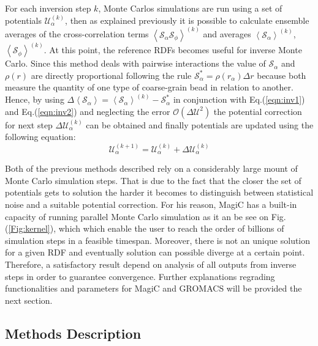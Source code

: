 \documentclass[10pt,a4paper,twoside]{article}
\begin{document}
For each inversion step $k$, Monte Carlos simulations are run using a set of potentials $\mathcal{U}_{\alpha}^{(k)}$, then as explained previously it is possible to calculate ensemble averages of the cross-correlation terms ${\left\langle\mathcal{S}_\alpha\mathcal{S}_\phi\right\rangle}^{(k)}$ and averages $\left\langle\mathcal{S}_\alpha\right\rangle^{(k)}$, $\left\langle\mathcal{S}_\phi\right\rangle^{(k)}$. At this point, the reference RDFs becomes useful for inverse Monte Carlo. Since this method deals with pairwise interactions the value of $\mathcal{S}_\alpha$ and $\rho(r)$ are directly proportional following the rule $\mathcal{S}_\alpha^{*}= \rho(r_\alpha)\Delta r $ \cite{magic} because both measure the quantity of one type of coarse-grain bead in relation to another. Hence, by using $\Delta\left\langle\mathcal{S}_\alpha\right\rangle = \left\langle\mathcal{S}_\alpha\right\rangle^{(k)} - \mathcal{S}_\alpha^{*}$  in conjunction with Eq.(\ref{eqn:inv1}) and Eq.(\ref{eqn:inv2}) and neglecting the error $\mathcal{O}({\Delta\mathcal{U}}^2)$ the potential correction for next step $\Delta\mathcal{U}_\alpha^{(k)}$ can be obtained and finally potentials are updated using the following  equation:
 \begin{equation}
\mathcal{U}_\alpha^{(k+1)}= \mathcal{U}_\alpha^{(k)}+\Delta\mathcal{U}_\alpha^{(k)}
\label{eqn:potup}
\end{equation} 

Both of the previous methods described rely on a considerably large mount of Monte Carlo simulation steps. That is due to the fact that the closer the set of potentials gets to solution the harder it becomes to distinguish between statistical noise and a suitable potential correction. For his reason, MagiC has a built-in capacity of running parallel Monte Carlo simulation as it an be see on Fig.(\ref{Fig:kernel}), which which enable the user to reach the order of billions of simulation steps in a feasible timespan. Moreover, there is not an unique solution for a given RDF \cite{ibi} and eventually solution can possible diverge at a certain point. Therefore, a satisfactory result depend on analysis of all outputs from inverse steps in order to guarantee convergence. Further explanations regrading functionalities and parameters for MagiC and GROMACS will be provided the next section.   
 
\subsection{Methods Description} 
\end{document}
